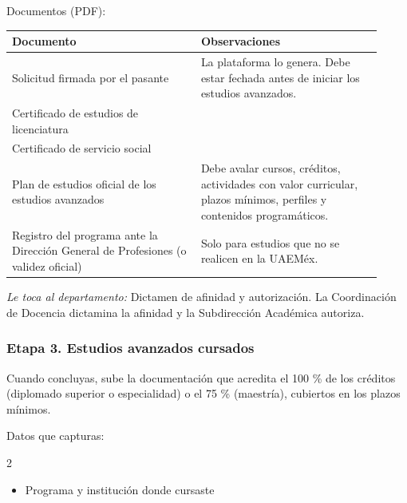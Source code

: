 Documentos (PDF):
{\small\begin{longtable}{>{\raggedright\arraybackslash}p{0.47\linewidth}>{\raggedright\arraybackslash}p{0.45\linewidth}}
\toprule
\textbf{Documento} & \textbf{Observaciones}\\
\midrule
\endhead
Solicitud firmada por el pasante & La plataforma lo genera. Debe estar fechada antes de iniciar los estudios avanzados.\\
Certificado de estudios de licenciatura & \\
Certificado de servicio social & \\
Plan de estudios oficial de los estudios avanzados & Debe avalar cursos, créditos, actividades con valor curricular, plazos mínimos, perfiles y contenidos programáticos.\\
Registro del programa ante la Dirección General de Profesiones (o validez oficial) & Solo para estudios que no se realicen en la UAEMéx.\\
\bottomrule
\end{longtable}}

\emph{Le toca al departamento:} Dictamen de afinidad y autorización. La Coordinación de Docencia dictamina la afinidad y la Subdirección Académica autoriza.
\subsubsection*{Etapa 3. Estudios avanzados cursados}
Cuando concluyas, sube la documentación que acredita el 100 \% de los créditos (diplomado superior o especialidad) o el 75 \% (maestría), cubiertos en los plazos mínimos.

Datos que capturas:
\begin{multicols}{2}\small
\begin{itemize}
  \item Programa y institución donde cursaste
\end{itemize}
\end{multicols}

